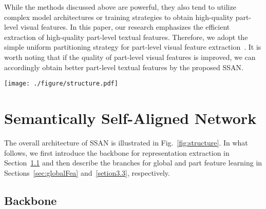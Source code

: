 \documentclass[journal]{IEEEtran}
\begin{document}
While the methods discussed above are powerful, they also tend to utilize complex model architectures or training strategies to obtain high-quality part-level visual features.
In this paper, our research emphasizes the efficient extraction of high-quality part-level textual features.
Therefore, we adopt the simple uniform partitioning strategy for part-level visual feature extraction~\cite{sun2018beyond}.
It is worth noting that if the quality of part-level visual features is improved, we can accordingly obtain better part-level textual features by the proposed SSAN.


\begin{figure*}[!t] \centering
  \texttt{[image: ./figure/structure.pdf]}
  \caption{The SSAN model architecture. Based on the ResNet-50 and Bi-LSTM backbones, SSAN extracts global and part features respectively from both modalities. For simplicity, only the global branch and the -th part branch are shown.  is equal to 3 in this figure. The other -1 part branches have the same structure as the -th one. For the global branch, we adopt a weight sharing strategy on the last  Conv layer, which aligns the features from the two modalities more tightly in terms of semantics. Each part branch includes one Part-specific Feature Learning (PFL) module and one Part Relation Learning (PRL) module. The former module enables SSAN to automatically extract part-level features from both modalities, without using any external tools or cross-modal operations; the latter enables SSAN to capture the relationships between body parts so as to establish better semantic correspondences with noun phrases.}
\label{fig:structure}
\end{figure*}


\section{Semantically Self-Aligned Network} \label{SSAN}
The overall architecture of SSAN is illustrated in Fig.~\ref{fig:structure}. In what follows, we first introduce the backbone for representation extraction in Section~\ref{setion3.1} and then describe the branches for global and part feature learning in Sections~\ref{sec:globalFea} and~\ref{setion3.3}, respectively.

\subsection{Backbone}\label{setion3.1}
\end{document}

